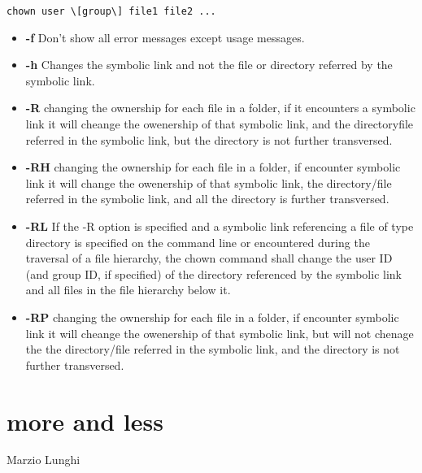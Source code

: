 \documentclass[hidelinks,12pt,a4paper,numbers=enddot]{scrartcl}
\begin{document}
\begin{verbatim}
chown user \[group\] file1 file2 ...
\end{verbatim}

\begin{itemize}
    \item \textbf{-f} Don't show all error messages except usage messages.
    \item \textbf{-h} Changes the symbolic link and not the file or directory referred
        by the symbolic link.
    
    \item \textbf{-R} changing the ownership for each file in a folder, if it encounters
        a symbolic link it will cheange the owenership of that symbolic link,
        and the directoryfile referred in the symbolic link, but the directory is not
        further transversed.
    
  \item \textbf{-RH} changing the ownership for each file in a folder, if encounter symbolic link
        it will change the owenership of that symbolic link,
        the directory/file referred in the symbolic link, and all the
        directory is further transversed.
    
  \item \textbf{-RL} If the -R option is specified and a symbolic link referencing a file of type directory
        is specified on the command line or encountered during the traversal of a file hierarchy,
        the chown command shall change the user ID (and group ID, if specified) of the directory
        referenced by the symbolic link and all files in the file hierarchy below it.
    
    \item \textbf{-RP} changing the ownership for each file in a folder, if encounter symbolic
        link it will cheange the owenership of that symbolic link, but will not chenage the
        the directory/file referred in the symbolic link, and  the directory is not
        further transversed.
    
\end{itemize}

\section{more and less}


\large Marzio Lunghi \normalsize\\
\end{document}
